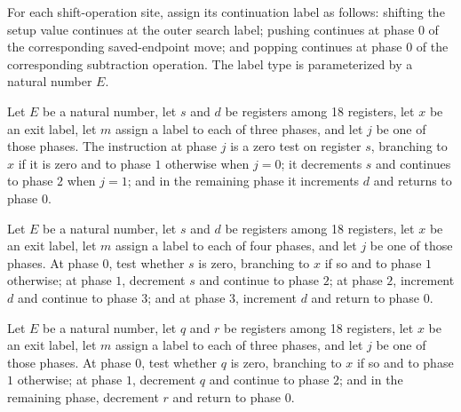 \begin{definition}
\label{Complexity.LogProg.SavitchARM.shExit}
\leanok
{}
For each shift-operation site, assign its continuation label as follows: shifting the
setup value continues at the outer search label; pushing continues at phase $0$ of the
corresponding saved-endpoint move; and popping continues at phase $0$ of the
corresponding subtraction operation. The label type is parameterized by a natural number
$E$.
\end{definition}

\begin{definition}
\label{Complexity.LogProg.SavitchARM.mvI}
\leanok
{}
Let $E$ be a natural number, let $s$ and $d$ be registers among 18 registers, let $x$ be
an exit label, let $m$ assign a label to each of three phases, and let $j$ be one of
those phases. The instruction at phase $j$ is a zero test on register $s$, branching to
$x$ if it is zero and to phase $1$ otherwise when $j=0$; it decrements $s$ and continues
to phase $2$ when $j=1$; and in the remaining phase it increments $d$ and returns to
phase $0$.
\end{definition}

\begin{definition}
\label{Complexity.LogProg.SavitchARM.dmI}
\leanok
{}
Let $E$ be a natural number, let $s$ and $d$ be registers among 18 registers, let $x$ be
an exit label, let $m$ assign a label to each of four phases, and let $j$ be one of
those phases. At phase $0$, test whether $s$ is zero, branching to $x$ if so and to
phase $1$ otherwise; at phase $1$, decrement $s$ and continue to phase $2$; at phase
$2$, increment $d$ and continue to phase $3$; and at phase $3$, increment $d$ and return
to phase $0$.
\end{definition}

\begin{definition}
\label{Complexity.LogProg.SavitchARM.sbI}
\leanok
{}
Let $E$ be a natural number, let $q$ and $r$ be registers among 18 registers, let $x$ be
an exit label, let $m$ assign a label to each of three phases, and let $j$ be one of
those phases. At phase $0$, test whether $q$ is zero, branching to $x$ if so and to
phase $1$ otherwise; at phase $1$, decrement $q$ and continue to phase $2$; and in the
remaining phase, decrement $r$ and return to phase $0$.
\end{definition}

